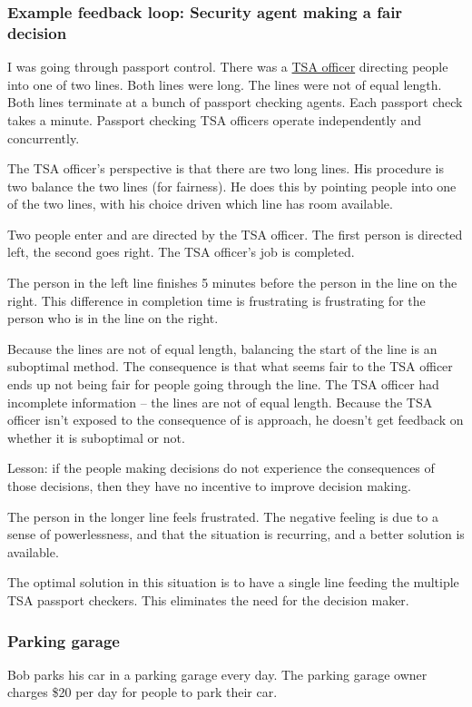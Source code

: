 \subsubsection{Example feedback loop: Security agent making a fair decision}
I was going through passport control. 
There was a \href{https://en.wikipedia.org/wiki/Transportation_Security_Administration}{TSA officer} directing people into one of two lines. Both lines were long. The lines were not of equal length. Both lines terminate at a bunch of passport checking agents. Each passport check takes a minute. Passport checking TSA officers operate independently and concurrently.


The TSA officer's perspective is that there are two long lines. His procedure is two balance the two lines (for fairness). He does this by pointing people into one of the two lines, with his choice driven which line has room available.

Two people enter and are directed by the TSA officer. The first person is directed left, the second goes right. The TSA officer's job is completed.

The person in the left line finishes 5 minutes before the person in the line on the right. This difference in completion time is frustrating is frustrating for the person who is in the line on the right.

Because the lines are not of equal length, balancing the start of the line is an suboptimal method. The consequence is that what seems fair to the TSA officer ends up not being fair for people going through the line. The TSA officer had incomplete information -- the lines are not of equal length. Because the TSA officer isn't exposed to the consequence of is approach, he doesn't get feedback on whether it is suboptimal or not.

Lesson: if the people making decisions do not experience the consequences of those decisions, then they have no incentive to improve decision making.

The person in the longer line feels frustrated. The negative feeling is due to a sense of powerlessness, and that the situation is recurring, and a better solution is available.

The optimal solution in this situation is to have a single line feeding the multiple TSA passport checkers. This eliminates the need for the decision maker.


\subsubsection{Parking garage}
Bob parks his car in a parking garage every day. 
The parking garage owner charges \$20 per day for people to park their car.

